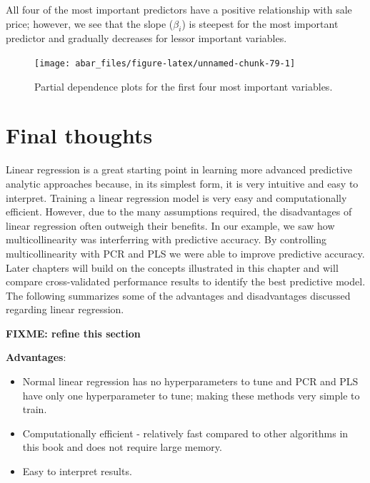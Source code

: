 \documentclass[]{book}
\providecommand{\tightlist}{%
  \setlength{\itemsep}{0pt}\setlength{\parskip}{0pt}}
\theoremstyle{definition}
\theoremstyle{definition}
\theoremstyle{definition}
\theoremstyle{remark}
\begin{document}
All four of the most important predictors have a positive relationship
with sale price; however, we see that the slope (\(\beta_i\)) is
steepest for the most important predictor and gradually decreases for
lessor important variables.

\begin{figure}

{\centering \texttt{[image: abar\_files/figure-latex/unnamed-chunk-79-1]} 

}

\caption{Partial dependence plots for the first four most important variables.}\label{fig:unnamed-chunk-79}
\end{figure}

\hypertarget{final-thoughts}{%
\section{Final thoughts}\label{final-thoughts}}

Linear regression is a great starting point in learning more advanced
predictive analytic approaches because, in its simplest form, it is very
intuitive and easy to interpret. Training a linear regression model is
very easy and computationally efficient. However, due to the many
assumptions required, the disadvantages of linear regression often
outweigh their benefits. In our example, we saw how multicollinearity
was interferring with predictive accuracy. By controlling
multicollinearity with PCR and PLS we were able to improve predictive
accuracy. Later chapters will build on the concepts illustrated in this
chapter and will compare cross-validated performance results to identify
the best predictive model. The following summarizes some of the
advantages and disadvantages discussed regarding linear regression.

\textbf{FIXME: refine this section}

\textbf{Advantages}:

\begin{itemize}
\tightlist
\item
  Normal linear regression has no hyperparameters to tune and PCR and
  PLS have only one hyperparameter to tune; making these methods very
  simple to train.
\item
  Computationally efficient - relatively fast compared to other
  algorithms in this book and does not require large memory.
\item
  Easy to interpret results.
\end{itemize}
\end{document}
